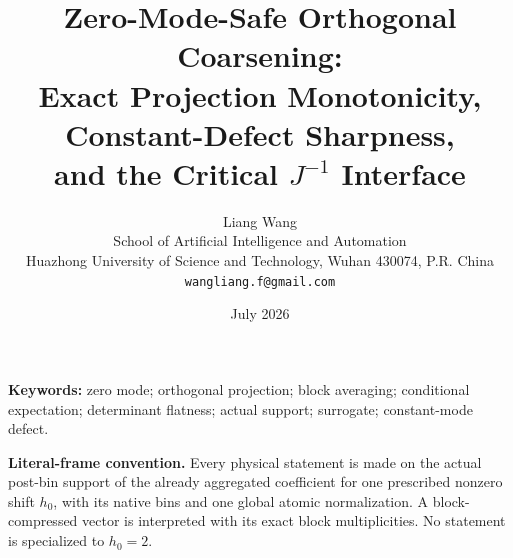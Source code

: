 \documentclass[11pt]{article}
\title{\textbf{Zero-Mode-Safe Orthogonal Coarsening:}\\
Exact Projection Monotonicity, Constant-Defect Sharpness,\\
and the Critical \(J^{-1}\) Interface}
\author{Liang Wang\\
School of Artificial Intelligence and Automation\\
Huazhong University of Science and Technology, Wuhan 430074, P.R. China\\
\texttt{wangliang.f@gmail.com}}
\date{July 2026}
\theoremstyle{definition}
\theoremstyle{remark}
\begin{document}
\maketitle



\noindent\textbf{Keywords:}
zero mode; orthogonal projection; block averaging; conditional
expectation; determinant flatness; actual support; surrogate;
constant-mode defect.

\medskip
\noindent\textbf{Literal-frame convention.}
Every physical statement is made on the actual post-bin support of
the already aggregated coefficient for one prescribed nonzero shift
\(h_0\), with its native bins and one global atomic normalization.
A block-compressed vector is interpreted with its exact block
multiplicities.  No statement is specialized to \(h_0=2\).












\begingroup
\footnotesize
\raggedright


\endgroup
\end{document}
